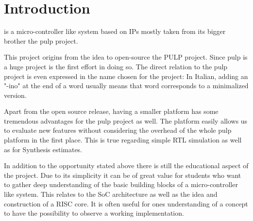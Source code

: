 
\chapter{Introduction}
\pulpino is a micro-controller like system based on IPs mostly taken from its bigger brother the \gls{pulp} project.

This project origins from the idea to open-source the PULP project. Since \gls{pulp} is a huge project \pulpino is
the first effort in doing so. The direct relation to the \gls{pulp} project is even expressed in the name chosen for
the project: In Italian, adding an "-ino" at the end of a word usually means that word corresponds to a minimalized version.

Apart from the open source release, having a smaller platform has some tremendous advantages for the \gls{pulp} project as
well. The \pulpino platform easily allows us to evaluate new features without considering the overhead of the whole \gls{pulp}
platform in the first place. This is true regarding simple RTL simulation as well as for Synthesis estimates.

In addition to the opportunity stated above there is still the educational aspect of the project. Due to its simplicity
it can be of great value for students who want to gather deep understanding of the basic building blocks of a
micro-controller like system. This relates to the SoC architecture as well as the idea and construction of a RISC core.
It is often useful for ones understanding of a concept to have the possibility to observe a working implementation.

